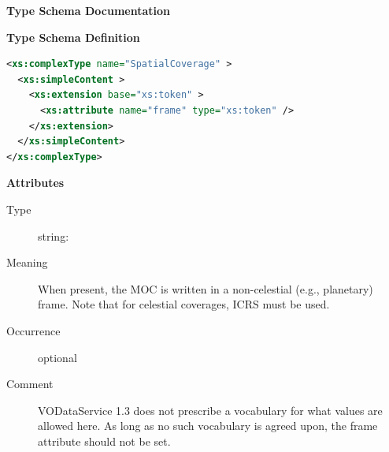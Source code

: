 \documentclass[11pt,a4paper]{ivoa}
\begin{document}
\begin{generated}
\begingroup
        \renewcommand*\descriptionlabel[1]{%
        \hbox to 5.5em{\emph{#1}\hfil}}\vspace{2ex}\noindent\textbf{ Type Schema Documentation}


\vspace{1ex}\noindent\textbf{ Type Schema Definition}

\begin{lstlisting}[language=XML,basicstyle=\footnotesize]
<xs:complexType name="SpatialCoverage" >
  <xs:simpleContent >
    <xs:extension base="xs:token" >
      <xs:attribute name="frame" type="xs:token" />
    </xs:extension>
  </xs:simpleContent>
</xs:complexType>
\end{lstlisting}

\vspace{0.5ex}\noindent\textbf{ Attributes}

\begingroup\small\begin{bigdescription}
\item[frame]
\begin{description}
\item[Type] string: 
\item[Meaning] When present, the MOC is written in a non-celestial (e.g.,
                     planetary) frame.  Note that for celestial coverages,
                     ICRS must be used.
\item[Occurrence] optional
\item[Comment] VODataService 1.3 does not prescribe a vocabulary for
                     what values are allowed here.  As
                     long as no such vocabulary is agreed upon, the frame
                     attribute should not be set.
\end{description}


\end{bigdescription}\endgroup

\endgroup
\end{generated}

\end{document}
